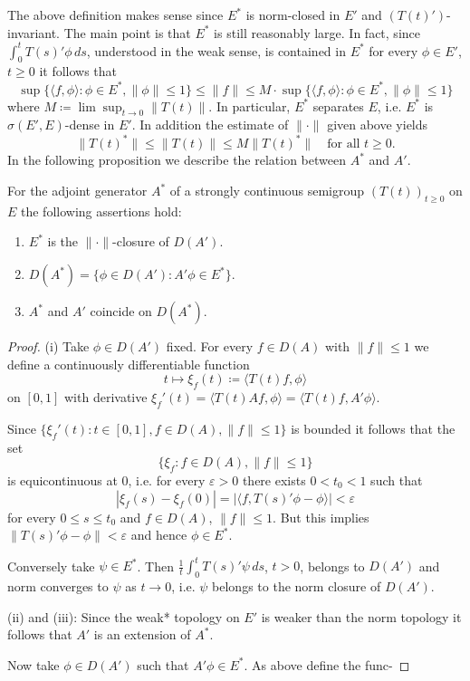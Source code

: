 The above definition makes sense since $E^{*}$ is norm-closed in $E'$ and $(T(t)')$-invariant.
The main point is that $E^{*}$ is still reasonably large.
In fact, since $\int_{0}^{t} T(s)'\phi \,ds$, understood in the weak sense, is contained in $E^{*}$ for every $\phi \in E'$, $t \geq 0$ it follows that
\[
    \sup\{\langle f,\phi \rangle : \phi \in E^{*}, \|\phi\| \leq 1\} \leq \|f\| \leq M\cdot\sup\{\langle f,\phi \rangle : \phi \in E^{*}, \|\phi\| \leq1\}
\]
where $M \coloneqq \lim\sup_{t \to 0} \|T(t)\|$.
In particular, $E^{*}$ separates $E$, i.e. $E^{*}$ is $\sigma(E',E)$-dense in $E'$.
In addition the estimate of $\|\cdot\|$ given above yields
\[
    \|T(t)^{*}\| \leq \|T(t)\| \leq M\|T(t)^{*}\| \quad \text{for all } t \geq 0.
\]
In the following proposition we describe the relation between $A^{*}$ and $A'$.
\begin{proposition}\label{prop:a1-3.1}
For the adjoint generator $A^{*}$ of a strongly continuous semigroup $(T(t))_{t \geq 0}$ on $E$ the following assertions hold:
\begin{enumerate}[i]
\item 
$E^{*}$ is the $\|\cdot\|$-closure of $D(A')$.

\item 
$D(A^{*}) = \{\phi \in D(A') : A'\phi \in E^{*}\}$.

\item 
$A^{*}$ and $A'$ coincide on $D(A^{*})$.
\end{enumerate}

\end{proposition}
\begin{proof}
(i) Take $\phi \in D(A')$ fixed.
For every $f \in D(A)$ with $\|f\| \leq 1$ we define a continuously differentiable function
\[
    t \mapsto \xi_{f}(t) \coloneqq \langle T(t)f,\phi \rangle
\]
on $[0,1]$ with derivative $\xi_{f}'(t) = \langle T(t)Af,\phi \rangle = \langle T(t)f,A'\phi \rangle$.

Since $\{\xi_{f}'(t) : t \in [0,1], f \in D(A), \|f\| \leq 1\}$ is bounded it follows that the set
\[
    \{\xi_{f} : f \in D(A), \|f\| \leq 1\}
\]
is equicontinuous at $0$, i.e. for every $\varepsilon > 0$ there exists $0 < t_{0} < 1$ such that
\[
    |\xi_{f}(s) - \xi_{f}(0)| = |\langle f,T(s)'\phi - \phi \rangle| < \varepsilon
\]
for every $0 \leq s \leq t_{0}$ and $f \in D(A)$, $\|f\| \leq 1$.
But this implies $\|T(s)'\phi - \phi\| < \varepsilon$ and hence $\phi \in E^{*}$.

Conversely take $\psi \in E^{*}$.
Then $\frac{1}{t}\int_{0}^{t} T(s)'\psi \,ds$, $t > 0$, belongs to $D(A')$ and norm converges to $\psi$ as $t \to 0$, i.e. $\psi$ belongs to the norm closure of $D(A')$.

(ii) and (iii): Since the weak* topology on $E'$ is weaker than the norm topology it follows that $A'$ is an extension of $A^{*}$.

Now take $\phi \in D(A')$ such that $A'\phi \in E^{*}$.
As above define the func-

\end{proof}



